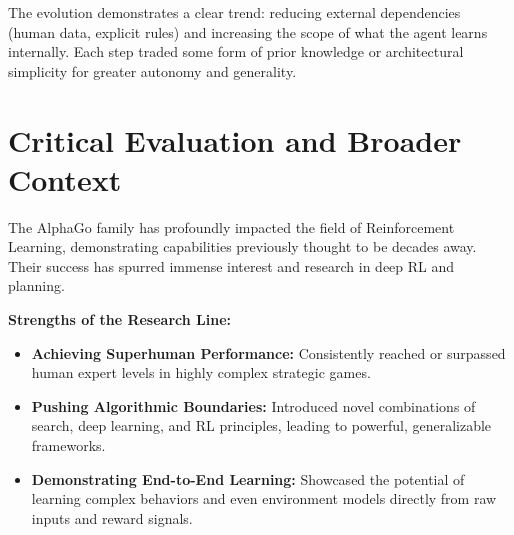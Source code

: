 \documentclass[11pt,a4paper]{article}
\begin{document}
The evolution demonstrates a clear trend: reducing external dependencies (human data, explicit rules) and increasing the scope of what the agent learns internally. Each step traded some form of prior knowledge or architectural simplicity for greater autonomy and generality.

\section{Critical Evaluation and Broader Context}
The AlphaGo family has profoundly impacted the field of Reinforcement Learning, demonstrating capabilities previously thought to be decades away. Their success has spurred immense interest and research in deep RL and planning.

\textbf{Strengths of the Research Line:}
\begin{itemize}
    \item \textbf{Achieving Superhuman Performance:} Consistently reached or surpassed human expert levels in highly complex strategic games.
    \item \textbf{Pushing Algorithmic Boundaries:} Introduced novel combinations of search, deep learning, and RL principles, leading to powerful, generalizable frameworks.
    \item \textbf{Demonstrating End-to-End Learning:} Showcased the potential of learning complex behaviors and even environment models directly from raw inputs and reward signals.
\end{itemize}
\end{document}
